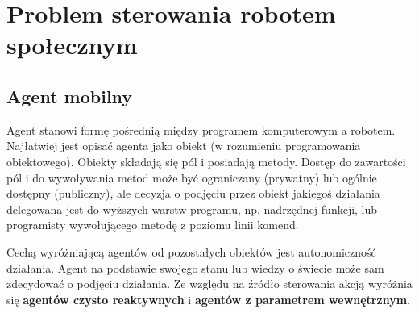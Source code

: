 \chapter{Problem sterowania robotem społecznym}

\section{Agent mobilny}




Agent stanowi formę pośrednią między programem komputerowym a robotem. Najłatwiej jest opisać agenta jako obiekt (w rozumieniu programowania obiektowego). Obiekty składają się pól i posiadają metody. Dostęp do zawartości pól i do wywoływania metod może być ograniczany (prywatny) lub ogólnie dostępny (publiczny), ale decyzja o podjęciu przez obiekt jakiegoś działania delegowana jest do wyższych warstw programu, np. nadrzędnej funkcji, lub programisty wywołującego metodę z poziomu linii komend. 

Cechą wyróżniającą agentów od pozostałych obiektów jest autonomiczność działania. Agent na podstawie swojego stanu lub wiedzy o świecie może sam zdecydować o podjęciu działania. Ze względu na źródło sterowania akcją wyróżnia się \textbf{agentów czysto reaktywnych} i  \textbf{agentów z parametrem wewnętrznym}. 

